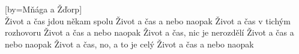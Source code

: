 [by={Mňága a Žďorp}]
\emptyv
\cseq{\[Em] \[G] \[C] \[D]}\\
\cl
\chordsoff
\freev
Život a čas jdou někam spolu
Život a čas a nebo naopak
Život a čas v tichým rozhovoru
Život a čas a nebo naopak
\cl
\freev
Život a čas, nic je nerozdělí
Život a čas a nebo naopak
Život a čas, no, a to je celý
Život a čas a nebo naopak
\cl
\endsong
